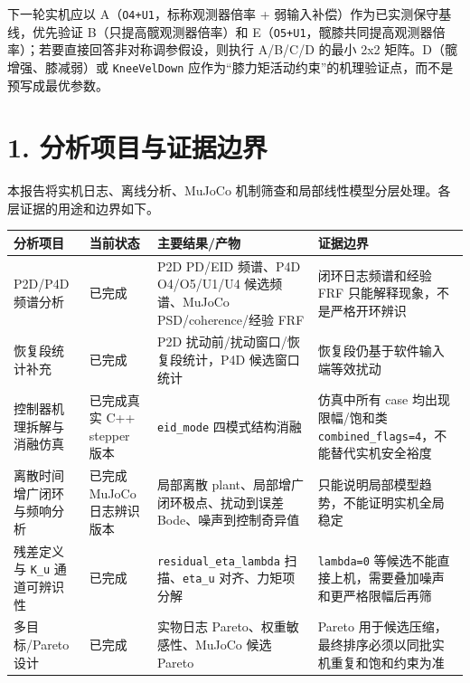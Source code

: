 下一轮实机应以 A（\texttt{O4+U1}，标称观测器倍率 + 弱输入补偿）作为已实测保守基线，优先验证 B（只提高髋观测器倍率）和 E（\texttt{O5+U1}，髋膝共同提高观测器倍率）；若要直接回答非对称调参假设，则执行 A/B/C/D 的最小 2x2 矩阵。D（髋增强、膝减弱）或 \texttt{KneeVelDown} 应作为``膝力矩活动约束''的机理验证点，而不是预写成最优参数。

\section{1. 分析项目与证据边界}\label{ux5206ux6790ux9879ux76eeux4e0eux8bc1ux636eux8fb9ux754c}

本报告将实机日志、离线分析、MuJoCo 机制筛查和局部线性模型分层处理。各层证据的用途和边界如下。

\begin{longtable}[]{@{}
  >{\raggedright\arraybackslash}p{}
  >{\raggedright\arraybackslash}p{}
  >{\raggedright\arraybackslash}p{}
  >{\raggedright\arraybackslash}p{}@{}}
\toprule\noalign{}
\begin{minipage}[b]{\linewidth}\raggedright
分析项目
\end{minipage} & \begin{minipage}[b]{\linewidth}\raggedright
当前状态
\end{minipage} & \begin{minipage}[b]{\linewidth}\raggedright
主要结果/产物
\end{minipage} & \begin{minipage}[b]{\linewidth}\raggedright
证据边界
\end{minipage} \\
\midrule\noalign{}
\endhead
\bottomrule\noalign{}
\endlastfoot
P2D/P4D 频谱分析 & 已完成 & P2D PD/EID 频谱、P4D O4/O5/U1/U4 候选频谱、MuJoCo PSD/coherence/经验 FRF & 闭环日志频谱和经验 FRF 只能解释现象，不是严格开环辨识 \\
恢复段统计补充 & 已完成 & P2D 扰动前/扰动窗口/恢复段统计，P4D 候选窗口统计 & 恢复段仍基于软件输入端等效扰动 \\
控制器机理拆解与消融仿真 & 已完成真实 C++ stepper 版本 & \texttt{eid\_mode} 四模式结构消融 & 仿真中所有 case 均出现限幅/饱和类 \texttt{combined\_flags=4}，不能替代实机安全裕度 \\
离散时间增广闭环与频响分析 & 已完成 MuJoCo 日志辨识版本 & 局部离散 plant、局部增广闭环极点、扰动到误差 Bode、噪声到控制奇异值 & 只能说明局部模型趋势，不能证明实机全局稳定 \\
残差定义与 \texttt{K\_u} 通道可辨识性 & 已完成 & \texttt{residual\_eta\_lambda} 扫描、\texttt{eta\_u} 对齐、力矩项分解 & \texttt{lambda=0} 等候选不能直接上机，需要叠加噪声和更严格限幅后再筛 \\
多目标/Pareto 设计 & 已完成 & 实物日志 Pareto、权重敏感性、MuJoCo 候选 Pareto & Pareto 用于候选压缩，最终排序必须以同批实机重复和饱和约束为准 \\
\end{longtable}

